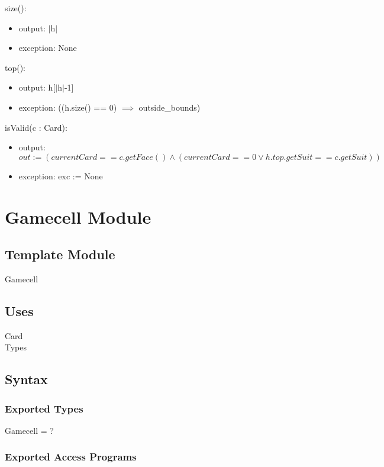 \documentclass[12pt]{article}
\begin{document}
\noindent size():
\begin{itemize}
	\item output: $|$h$|$
	\item exception: None
\end{itemize}

\noindent top():
\begin{itemize}
	\item output: h[$|$h$|$-1]
	\item exception: ((h.size() == 0) $\implies$ outside\_bounds)
\end{itemize}

\noindent isValid(c : Card):
\begin{itemize}
	\item output: $out := (currentCard == c.getFace() \land (currentCard == 0 \lor h.top.getSuit == c.getSuit))$
	\item exception: exc := None
\end{itemize}

\newpage

\section* {Gamecell Module}

\subsection*{Template Module}

Gamecell

\subsection* {Uses}

Card\\
Types

\subsection* {Syntax}

\subsubsection* {Exported Types}

Gamecell = ? 

\subsubsection* {Exported Access Programs}
\end{document}
